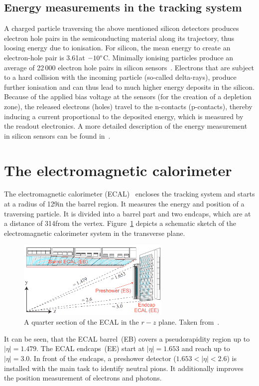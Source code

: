 \subsection*{Energy measurements in the tracking system}
A charged particle traversing the above mentioned silicon detectors produces electron hole pairs in the semiconducting material along its trajectory, thus loosing energy due to ionisation.
For silicon, the mean energy to create an electron-hole pair is 3.61\ev at $-10\degree$C.
Minimally ionising particles produce an average of 22\,000 electron hole pairs in silicon sensors~\cite{Thesis_Jenny}.
Electrons that are subject to a hard collision with the incoming particle (so-called delta-rays), produce further ionisation and can thus lead to much higher energy deposits in the silicon.
Because of the applied bias voltage at the sensors (for the creation of a depletion zone), the released electrons (holes) travel to the n-contacts (p-contacts), thereby inducing a current proportional to the deposited energy, which is measured by the readout electronics. 
A more detailed description of the energy measurement in silicon sensors can be found in~\cite{Thesis_Jenny}.

\section{The electromagnetic calorimeter}
The electromagnetic calorimeter (ECAL)~\cite{bib:CMS:TDR_2006,bib:CMS:TDR_ECAL} encloses the tracking system and starts at a radius of 129\cm in the barrel region.
It measures the energy and position of a traversing particle.
It is divided into a barrel part and two endcaps, which are at a distance of 314\cm from the vertex.
Figure~\ref{fig:ECAL} depicts a schematic sketch of the electromagnetic calorimeter system in the transverse plane.
\begin{figure}[!b]
  \centering
      \includegraphics[width=0.65\textwidth]{figures/experiment/CMS/Figures_Experimental_Apparatus_ECALRapidity.png}
  \caption{A quarter section of the ECAL in the $r-z$ plane. Taken from~\cite{bib:CMS:TDR_2006}.}  
  \label{fig:ECAL}
\end{figure}
It can be seen, that the ECAL barrel~(EB) covers a pseudorapidity region up to $|\eta|=1.479$.
The ECAL endcaps~(EE) start at $|\eta|=1.653$ and reach up to $|\eta|=3.0$.
In front of the endcaps, a preshower detector ($1.653<|\eta|<2.6$) is installed with the main task to identify neutral pions.
It additionally improves the position measurement of electrons and photons.

